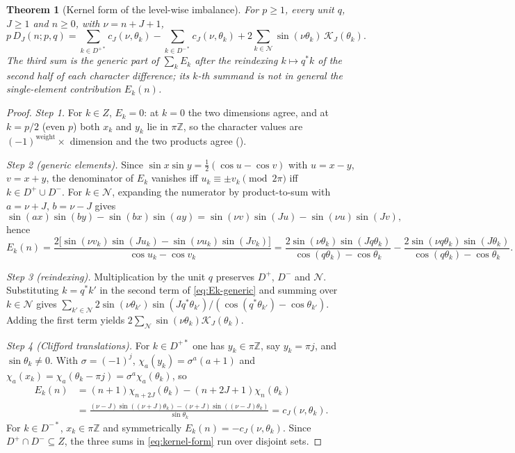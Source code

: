 \documentclass[11pt]{article}
\newtheorem{theorem}{Theorem}[section]
\theoremstyle{definition}
\newcommand{\Z}{\mathbb Z}
\newcommand{\cK}{\mathcal K}
\begin{document}
\begin{theorem}[Kernel form of the level-wise imbalance]
\label{thm:kernel}
For $p\geq1$, every unit $q$, $J\geq1$ and $n\geq0$, with $\nu=n+J+1$,
\begin{equation}
 p\,D_J(n;p,q)=\sum_{k\in D^{+*}}c_J(\nu,\theta_k)
 -\sum_{k\in D^{-*}}c_J(\nu,\theta_k)
 +2\sum_{k\in\mathcal N}\sin(\nu\theta_k)\,\cK_J(\theta_k).
 \label{eq:kernel-form}
\end{equation}
The third sum is the generic part of $\sum_kE_k$ after the reindexing
$k\mapsto q^*k$ of the second half of each character difference; its
$k$-th summand is not in general the single-element contribution
$E_k(n)$.
\end{theorem}

\begin{proof}
\emph{Step 1.}  For $k\in Z$, $E_k=0$: at $k=0$ the two dimensions
agree, and at $k=p/2$ (even $p$) both $x_k$ and $y_k$ lie in $\pi\Z$, so
the character values are $(-1)^{\text{weight}}\times$ dimension and the
two products agree (\cite[Lem.~5.3]{MahmoodP1Collection2026}).

\emph{Step 2 (generic elements).}  Since
$\sin x\sin y=\tfrac12(\cos u-\cos v)$ with $u=x-y$, $v=x+y$, the
denominator of $E_k$ vanishes iff $u_k\equiv\pm v_k\pmod{2\pi}$ iff
$k\in D^+\cup D^-$.  For $k\in\mathcal N$, expanding the numerator by
product-to-sum with $a=\nu+J$, $b=\nu-J$ gives
\[
 \sin(ax)\sin(by)-\sin(bx)\sin(ay)
 =\sin(\nu v)\sin(Ju)-\sin(\nu u)\sin(Jv),
\]
hence
\begin{equation}
 E_k(n)=\frac{2\bigl[\sin(\nu v_k)\sin(Ju_k)-\sin(\nu u_k)\sin(Jv_k)\bigr]}
 {\cos u_k-\cos v_k}
 =\frac{2\sin(\nu\theta_k)\sin(Jq\theta_k)}{\cos(q\theta_k)-\cos\theta_k}
 -\frac{2\sin(\nu q\theta_k)\sin(J\theta_k)}{\cos(q\theta_k)-\cos\theta_k}.
 \label{eq:Ek-generic}
\end{equation}

\emph{Step 3 (reindexing).}  Multiplication by the unit $q$ preserves
$D^+$, $D^-$ and $\mathcal N$.  Substituting $k=q^*k'$ in the second term
of \eqref{eq:Ek-generic} and summing over $k\in\mathcal N$ gives
$\sum_{k'\in\mathcal N}2\sin(\nu\theta_{k'})\sin(Jq^*\theta_{k'})/
(\cos(q^*\theta_{k'})-\cos\theta_{k'})$.  Adding the first term yields
$2\sum_{\mathcal N}\sin(\nu\theta_k)\cK_J(\theta_k)$.

\emph{Step 4 (Clifford translations).}  For $k\in D^{+*}$ one has
$y_k\in\pi\Z$, say $y_k=\pi j$, and $\sin\theta_k\neq0$.  With
$\sigma=(-1)^j$, $\chi_a(y_k)=\sigma^a(a+1)$ and
$\chi_a(x_k)=\chi_a(\theta_k-\pi j)=\sigma^a\chi_a(\theta_k)$, so
\begin{align*}
 E_k(n)&=(n+1)\chi_{n+2J}(\theta_k)-(n+2J+1)\chi_n(\theta_k)\\
 &=\frac{(\nu-J)\sin((\nu+J)\theta_k)-(\nu+J)\sin((\nu-J)\theta_k)}{\sin\theta_k}
 =c_J(\nu,\theta_k).
\end{align*}
For $k\in D^{-*}$, $x_k\in\pi\Z$ and symmetrically $E_k(n)=-c_J(\nu,\theta_k)$.
Since $D^+\cap D^-\subseteq Z$, the three sums in \eqref{eq:kernel-form}
run over disjoint sets.
\end{proof}
\end{document}

